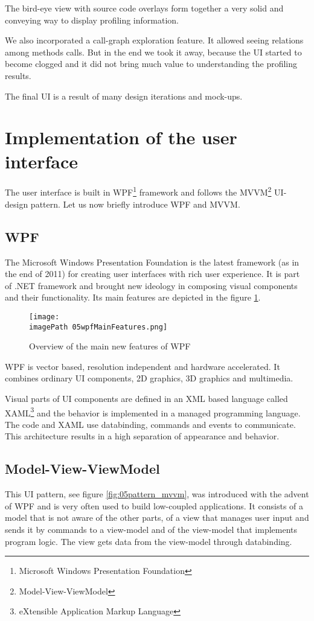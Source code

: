 The bird-eye view with source code overlays form together a very solid and conveying way to display profiling information. 

We also incorporated a call-graph exploration feature. It allowed seeing relations among methods calls. But in the end we took it away, because the UI started to become clogged and it did not bring much value to understanding the profiling results. 

The final UI is a result of many design iterations and mock-ups.

\section{Implementation of the user interface}
The user interface is built in WPF\footnote{Microsoft Windows Presentation Foundation} framework \cite{WPF4Unleashed} and follows the MVVM\footnote{Model-View-ViewModel} \cite{MVVM2011} UI-design pattern. Let us now briefly introduce WPF and MVVM.

\subsection{WPF}
The Microsoft Windows Presentation Foundation is the latest framework (as in the end of 2011) for creating user interfaces with rich user experience. It is part of .NET framework and brought new ideology in composing visual components and their functionality. Its main features are depicted in the figure \ref{fig:05wpfMainFeatures}.

\begin{figure}
	\centering
		\texttt{[image: \\imagePath 05wpfMainFeatures.png]}
		\caption{Overview of the main new features of WPF \cite{WPFpage}}
	\label{fig:05wpfMainFeatures}
\end{figure}

WPF is vector based, resolution independent and hardware accelerated. It combines ordinary UI components, 2D graphics, 3D graphics and multimedia. 

Visual parts of UI components are defined in an XML based language called \linebreak XAML\footnote{eXtensible Application Markup Language} and the behavior is implemented in a managed programming language. The code and XAML use databinding, commands and events to communicate. This architecture results in a high separation of appearance and behavior.

\subsection{Model-View-ViewModel}
This UI pattern, see figure \ref{fig:05pattern_mvvm}, was introduced with the advent of WPF and is very often used to build low-coupled applications. It consists of a model that is not aware of the other parts, of a view that manages user input and sends it by commands to a view-model and of the view-model that implements program logic. The view gets data from the view-model through databinding.


